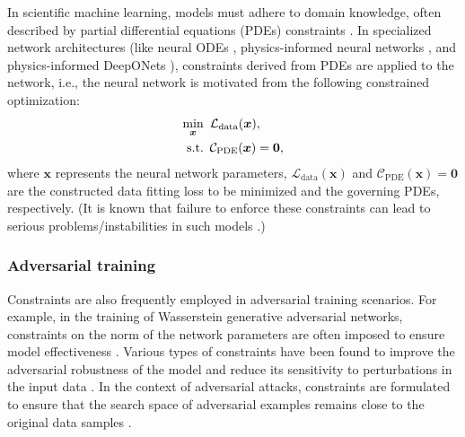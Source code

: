 \documentclass[aos]{imsart}
\numberwithin{equation}{section}
\theoremstyle{plain}
\begin{document}
In scientific machine learning, models must adhere to domain knowledge, often described by partial differential equations (PDEs) constraints \cite{failure21_TR,Cuomo2022Scientific,differentiable_hard_22_TR,learnConservation1_TR}. 
In specialized network architectures (like neural ODEs \cite{chen2018neural}, physics-informed neural networks \cite{raissi2019physics, karniadakis2021physics, failure21_TR}, and physics-informed DeepONets \cite{wang2021learning}), constraints derived from PDEs are applied to the network, i.e., the neural network is motivated from the following constrained optimization:
\begin{equation*}
    \begin{split}
        \min_{\bm{x}} & \hspace{0.5em} \mathcal{L}_{\text{data}}(\bm{x}), \\
        \text{s.t.} & \hspace{0.5em} \mathcal{C}_{\text{PDE}}(\bm{x}) = \bm{0},
    \end{split}
\end{equation*}
where $\bm{x}$ represents the neural network parameters, $\mathcal{L}_{\text{data}}(\bm{x})$ and $\mathcal{C}_{\text{PDE}}(\bm{x}) = \bm{0}$ are the constructed data fitting loss to be minimized and the governing PDEs, respectively. 
(It is known that failure to enforce these constraints can lead to serious problems/instabilities in such models \cite{failure21_TR,differentiable_hard_22_TR,learnConservation1_TR}.)


\subsubsection{Adversarial training}
Constraints are also frequently employed in adversarial training scenarios. 
For example, in the training of Wasserstein generative adversarial networks, constraints on the norm of the network parameters are often imposed to ensure model effectiveness \cite{arjovsky2017wasserstein}. Various types of constraints have been found to improve the adversarial robustness of the model and reduce its sensitivity to perturbations in the input data \cite{cisse2017parseval}. In the context of adversarial attacks, constraints are formulated to ensure that the search space of adversarial examples remains close to the original data samples \cite{goodfellow2014explaining, su2019one, zhu2023adversarial}.
\end{document}
